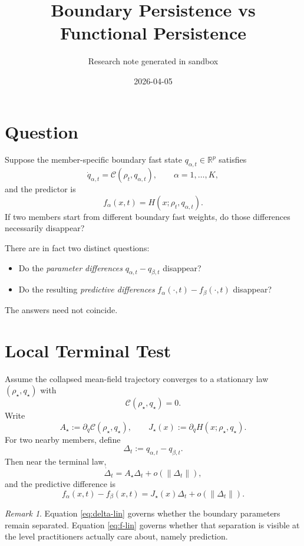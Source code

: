 \documentclass[11pt]{article}
\title{Boundary Persistence vs Functional Persistence}
\author{Research note generated in sandbox}
\date{2026-04-05}
\newcommand{\R}{\mathbb{R}}
\theoremstyle{remark}
\newtheorem{remark}[theorem]{Remark}
\begin{document}
\maketitle

\section{Question}

Suppose the member-specific boundary fast state $q_{\alpha,t}\in\R^p$ satisfies
\begin{equation}
\dot q_{\alpha,t}=\mathcal C(\rho_t,q_{\alpha,t}),
\qquad
\alpha=1,\dots,K,
\label{eq:q-dyn}
\end{equation}
and the predictor is
\[
f_\alpha(x,t)=H(x;\rho_t,q_{\alpha,t}).
\]
If two members start from different boundary fast weights, do those differences necessarily disappear?

\medskip

There are in fact two distinct questions:
\begin{itemize}
\item Do the \emph{parameter differences} $q_{\alpha,t}-q_{\beta,t}$ disappear?
\item Do the resulting \emph{predictive differences} $f_\alpha(\cdot,t)-f_\beta(\cdot,t)$ disappear?
\end{itemize}

The answers need not coincide.

\section{Local Terminal Test}

Assume the collapsed mean-field trajectory converges to a stationary law $(\rho_\star,q_\star)$ with
\[
\mathcal C(\rho_\star,q_\star)=0.
\]
Write
\[
A_\star := \partial_q \mathcal C(\rho_\star,q_\star),
\qquad
J_\star(x) := \partial_q H(x;\rho_\star,q_\star).
\]
For two nearby members, define
\[
\Delta_t := q_{\alpha,t}-q_{\beta,t}.
\]
Then near the terminal law,
\begin{equation}
\dot \Delta_t = A_\star \Delta_t + o(\|\Delta_t\|),
\label{eq:delta-lin}
\end{equation}
and the predictive difference is
\begin{equation}
f_\alpha(x,t)-f_\beta(x,t)
=
J_\star(x)\Delta_t + o(\|\Delta_t\|).
\label{eq:f-lin}
\end{equation}

\begin{remark}
Equation \eqref{eq:delta-lin} governs whether the boundary parameters remain separated. Equation \eqref{eq:f-lin} governs whether that separation is visible at the level practitioners actually care about, namely prediction.
\end{remark}
\end{document}

